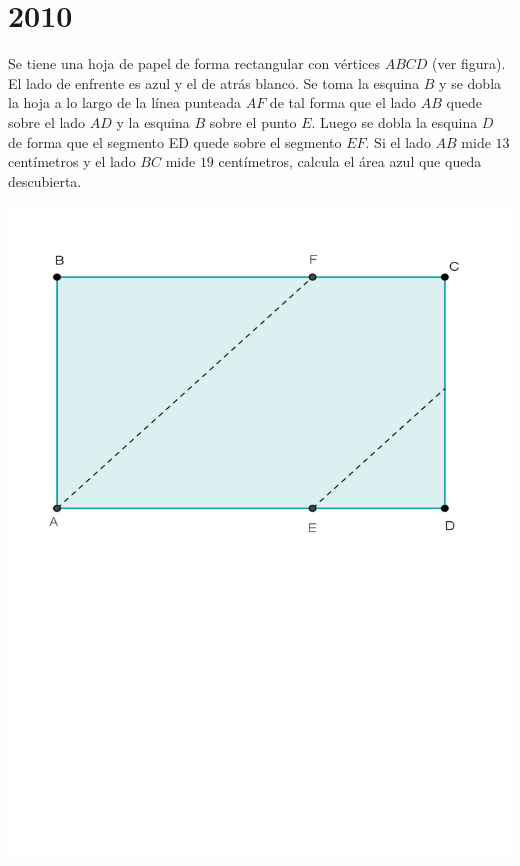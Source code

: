 \chapter{2010}
\label{cha:2010}

\begin{Problema}{1}
  Se tiene una hoja de papel de forma rectangular con v\'ertices
  $ABCD$ (ver figura). El lado de enfrente es azul y el de atr\'as
  blanco. Se toma la esquina $B$ y se dobla la hoja a lo largo de la
  l\'inea punteada $AF$ de tal forma que el lado $AB$ quede sobre el
  lado $AD$ y la esquina $B$ sobre el punto $E$. Luego se dobla la
  esquina $D$ de forma que el segmento ED quede sobre el segmento
  $EF$. Si el lado $AB$ mide $13$ cent\'imetros y el lado $BC$ mide
  $19$ cent\'imetros, calcula el \'area azul que queda descubierta.

  \begin{center}
    \includegraphics[scale=0.5,viewport=13 358 569 764]{hoja1.pdf}
  \end{center}
\end{Problema}

